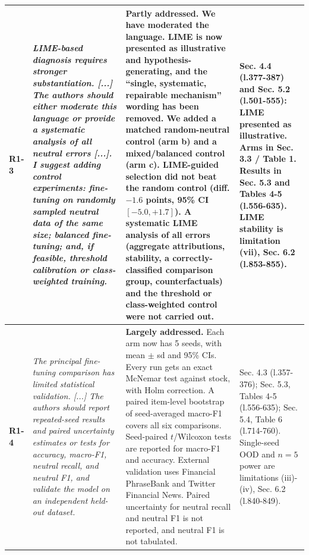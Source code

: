 \documentclass[10pt]{article}
\begin{document}
\begin{longtable}{>{\raggedright\arraybackslash}p{1.1cm}>{\raggedright\arraybackslash}p{8.2cm}>{\raggedright\arraybackslash}p{9.0cm}>{\raggedright\arraybackslash}p{6.0cm}}
\textbf{R1-3} & \emph{LIME-based diagnosis requires stronger substantiation. [...] The authors should either moderate this language or provide a systematic analysis of all neutral errors [...]. I suggest adding control experiments: fine-tuning on randomly sampled neutral data of the same size; balanced fine-tuning; and, if feasible, threshold calibration or class-weighted training.} & \textbf{Partly addressed.} We have moderated the language. LIME is now presented as illustrative and hypothesis-generating, and the ``single, systematic, repairable mechanism'' wording has been removed. We added a matched random-neutral control (arm b) and a mixed/balanced control (arm c). LIME-guided selection did not beat the random control (diff. $-1.6$ points, 95\% CI $[-5.0,+1.7]$). A systematic LIME analysis of all errors (aggregate attributions, stability, a correctly-classified comparison group, counterfactuals) and the threshold or class-weighted control were not carried out. & Sec. 4.4 (l.377-387) and Sec. 5.2 (l.501-555): LIME presented as illustrative. Arms in Sec. 3.3 / Table 1. Results in Sec. 5.3 and Tables 4-5 (l.556-635). LIME stability is limitation (vii), Sec. 6.2 (l.853-855). \\ \midrule
\textbf{R1-4} & \emph{The principal fine-tuning comparison has limited statistical validation. [...] The authors should report repeated-seed results and paired uncertainty estimates or tests for accuracy, macro-F1, neutral recall, and neutral F1, and validate the model on an independent held-out dataset.} & \textbf{Largely addressed.} Each arm now has 5 seeds, with mean $\pm$ sd and 95\% CIs. Every run gets an exact McNemar test against stock, with Holm correction. A paired item-level bootstrap of seed-averaged macro-F1 covers all six comparisons. Seed-paired $t$/Wilcoxon tests are reported for macro-F1 and accuracy. External validation uses Financial PhraseBank and Twitter Financial News. Paired uncertainty for neutral recall and neutral F1 is not reported, and neutral F1 is not tabulated. & Sec. 4.3 (l.357-376); Sec. 5.3, Tables 4-5 (l.556-635); Sec. 5.4, Table 6 (l.714-760). Single-seed OOD and $n=5$ power are limitations (iii)-(iv), Sec. 6.2 (l.840-849). \\ \midrule

\end{longtable}
\end{document}
